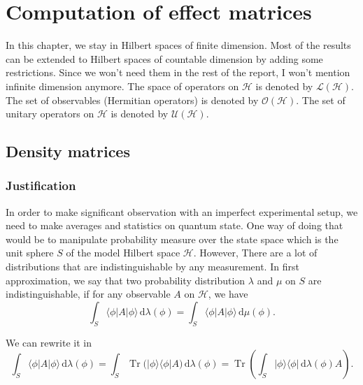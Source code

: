 \documentclass[10pt,a4paper]{report}
\theoremstyle{plain}
\theoremstyle{definition}
\theoremstyle{remark}
\newcommand{\ket}[1]{|#1\rangle}
\newcommand{\bra}[1]{\langle#1|}
\newcommand{\dd}{\mathrm{d}}
\DeclareMathOperator{\Tr}{Tr}
\begin{document}




\chapter{Computation of effect matrices }

In this chapter, we stay in Hilbert spaces of finite dimension. Most of the
results can be extended to Hilbert spaces of countable dimension by adding
some restrictions.
Since we won't need them in the rest of the report, I won't mention infinite
dimension anymore. The space of operators on
$\mathcal{H}$ is denoted by $\mathcal{L}(\mathcal{H})$. The set of observables
(Hermitian operators) is denoted by $\mathcal{O}(\mathcal{H})$. The set of
unitary operators on $\mathcal{H}$ is denoted by $\mathcal{U}(\mathcal{H})$.

\section{Density matrices}

\subsection{Justification}

In order to make significant observation with an imperfect experimental setup, we need to make averages and statistics on quantum state.
One way of doing that would be to manipulate probability measure over the state
space which is the unit sphere $S$ of the model Hilbert space $\mathcal{H}$.
However, There are a lot of distributions that are indistinguishable by any
measurement. In first approximation, we say that two probability distribution
$\lambda$ and $\mu$ on $S$ are indistinguishable,
if for any observable $A$ on $\mathcal{H}$, we
have
\[\int_S \bra \phi A \ket \phi\,\dd \lambda(\phi) = \int_S \bra \phi A \ket
  \phi\,\dd \mu(\phi) .\]

We can rewrite it in
\[\int_S \bra \phi A \ket \phi\,\dd \lambda(\phi)
  = \int_S \Tr\big(\ket \phi \bra \phi A\big) \,\dd \lambda(\phi)
  = \Tr\left(\int_S \ket \phi \bra \phi \,\dd \lambda(\phi) A \right).\]
\end{document}
